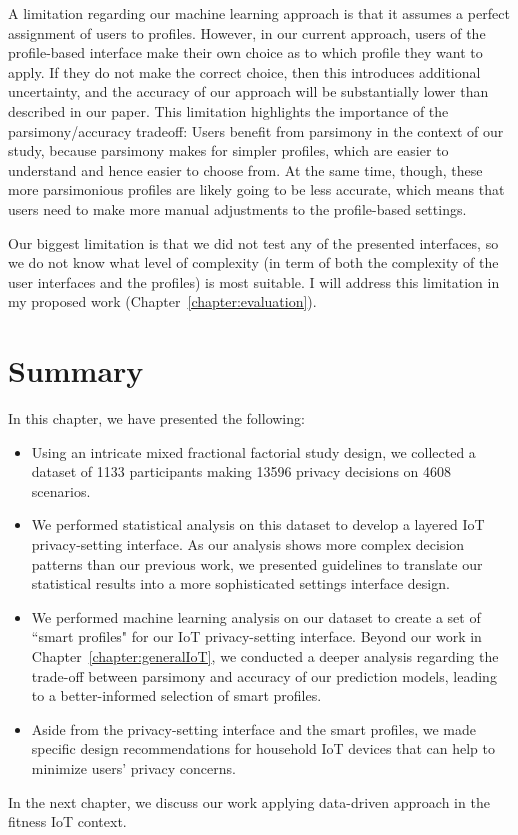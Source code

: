 A limitation regarding our machine learning approach is that it assumes a perfect assignment of users to profiles. However, in our current approach, users of the profile-based interface make their own choice as to which profile they want to apply. If they do not make the correct choice, then this introduces additional uncertainty, and the accuracy of our approach will be substantially lower than described in our paper. This limitation highlights the importance of the parsimony/accuracy tradeoff: Users benefit from parsimony in the context of our study, because parsimony makes for simpler profiles, which are easier to understand and hence easier to choose from. At the same time, though, these more parsimonious profiles are likely going to be less accurate, which means that users need to make more manual adjustments to the profile-based settings.

Our biggest limitation is that we did not test any of the presented interfaces, so we do not know what level of complexity (in term of both the complexity of the user interfaces and the profiles) is most suitable. I will address this limitation in my proposed work (Chapter~\ref{chapter:evaluation}).

\section{Summary}
In this chapter, we have presented the following:
\begin{itemize}
	\item Using an intricate mixed fractional factorial study design, we collected a dataset of 1133 participants making 13596 privacy decisions on 4608 scenarios.
	\item We performed statistical analysis on this dataset to develop a layered IoT privacy-setting interface. As our analysis shows more complex decision patterns than our previous work, we presented guidelines to translate our statistical results into a more sophisticated settings interface design.
	\item We performed machine learning analysis on our dataset to create a set of ``smart profiles" for our IoT privacy-setting interface. Beyond our work in Chapter~\ref{chapter:generalIoT}, we conducted a deeper analysis regarding the trade-off between parsimony and accuracy of our prediction models, leading to a better-informed selection of smart profiles.
	\item Aside from the privacy-setting interface and the smart profiles, we made specific design recommendations for household IoT devices that can help to minimize users' privacy concerns. 
\end{itemize}

In the next chapter, we discuss our work applying data-driven approach in the fitness IoT context. 